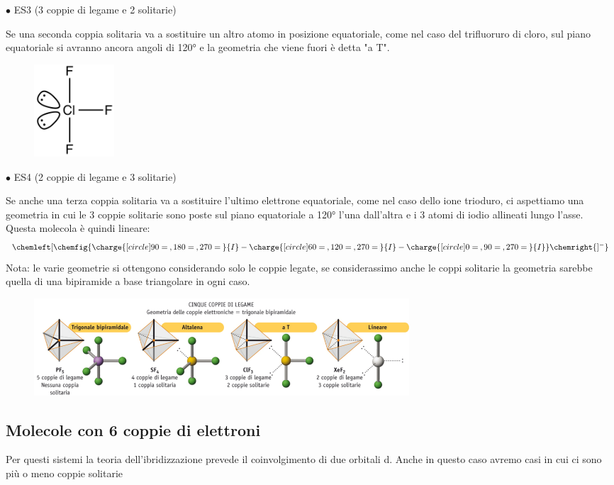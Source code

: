 \newpage

$\bullet$ ES3  (3 coppie di legame e 2 solitarie)

Se una seconda coppia solitaria va a sostituire un altro atomo in posizione equatoriale, come nel caso del trifluoruro di cloro, sul piano equatoriale si avranno ancora angoli di 120° e la geometria che viene fuori è detta "a T".
\begin{figure}[htp]
    \centering
    \includegraphics[width=3cm]{immagini/ClF_3.png}
\end{figure}

$\bullet$ ES4  (2 coppie di legame e 3 solitarie)

Se anche una terza coppia solitaria va a sostituire l'ultimo elettrone equatoriale, come nel caso dello ione trioduro, ci aspettiamo una geometria in cui le 3 coppie solitarie sono poste sul piano equatoriale a 120° l'una dall'altra e i 3 atomi di iodio allineati lungo l'asse. Questa molecola è quindi lineare:
$$
\chemleft[ \chemfig{\charge{[circle]90=\:,180=\:,270=\:}{I}-\charge{[circle]60=\:,120=\:,270=\:}{I}-\charge{[circle]0=\:,90=\:,270=\:}{I}} \chemright{]^{-}}
$$
Nota: le varie geometrie si ottengono considerando solo le coppie legate, se considerassimo anche le coppi solitarie la geometria sarebbe quella di una bipiramide a base triangolare in ogni caso.
\begin{figure}[htp]
    \centering
    \includegraphics[width=14cm]{immagini/geometrie-5-coppie.png}
\end{figure}
\subsection{Molecole con 6 coppie di elettroni}
Per questi sistemi la teoria dell'ibridizzazione prevede il coinvolgimento di due orbitali d. Anche in questo caso avremo casi in cui ci sono più o meno coppie solitarie

